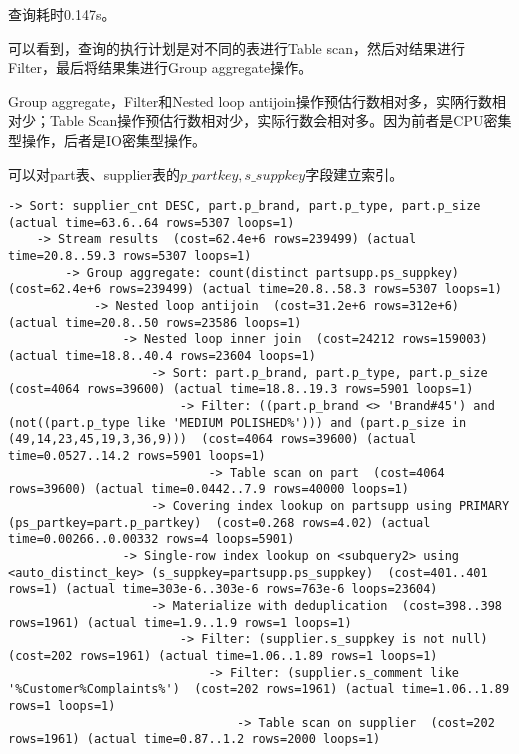 \documentclass{article}
\begin{document}
查询耗时0.147s。

可以看到，查询的执行计划是对不同的表进行Table scan，然后对结果进行Filter，最后将结果集进行Group aggregate操作。

Group aggregate，Filter和Nested loop antijoin操作预估行数相对多，实陃行数相对少；Table Scan操作预估行数相对少，实际行数会相对多。因为前者是CPU密集型操作，后者是IO密集型操作。

可以对part表、supplier表的$p\_partkey,s\_suppkey$字段建立索引。

\begin{lstlisting}
-> Sort: supplier_cnt DESC, part.p_brand, part.p_type, part.p_size  (actual time=63.6..64 rows=5307 loops=1)
    -> Stream results  (cost=62.4e+6 rows=239499) (actual time=20.8..59.3 rows=5307 loops=1)
        -> Group aggregate: count(distinct partsupp.ps_suppkey)  (cost=62.4e+6 rows=239499) (actual time=20.8..58.3 rows=5307 loops=1)
            -> Nested loop antijoin  (cost=31.2e+6 rows=312e+6) (actual time=20.8..50 rows=23586 loops=1)
                -> Nested loop inner join  (cost=24212 rows=159003) (actual time=18.8..40.4 rows=23604 loops=1)
                    -> Sort: part.p_brand, part.p_type, part.p_size  (cost=4064 rows=39600) (actual time=18.8..19.3 rows=5901 loops=1)
                        -> Filter: ((part.p_brand <> 'Brand#45') and (not((part.p_type like 'MEDIUM POLISHED%'))) and (part.p_size in (49,14,23,45,19,3,36,9)))  (cost=4064 rows=39600) (actual time=0.0527..14.2 rows=5901 loops=1)
                            -> Table scan on part  (cost=4064 rows=39600) (actual time=0.0442..7.9 rows=40000 loops=1)
                    -> Covering index lookup on partsupp using PRIMARY (ps_partkey=part.p_partkey)  (cost=0.268 rows=4.02) (actual time=0.00266..0.00332 rows=4 loops=5901)
                -> Single-row index lookup on <subquery2> using <auto_distinct_key> (s_suppkey=partsupp.ps_suppkey)  (cost=401..401 rows=1) (actual time=303e-6..303e-6 rows=763e-6 loops=23604)
                    -> Materialize with deduplication  (cost=398..398 rows=1961) (actual time=1.9..1.9 rows=1 loops=1)
                        -> Filter: (supplier.s_suppkey is not null)  (cost=202 rows=1961) (actual time=1.06..1.89 rows=1 loops=1)
                            -> Filter: (supplier.s_comment like '%Customer%Complaints%')  (cost=202 rows=1961) (actual time=1.06..1.89 rows=1 loops=1)
                                -> Table scan on supplier  (cost=202 rows=1961) (actual time=0.87..1.2 rows=2000 loops=1)
\end{lstlisting}
\end{document}
